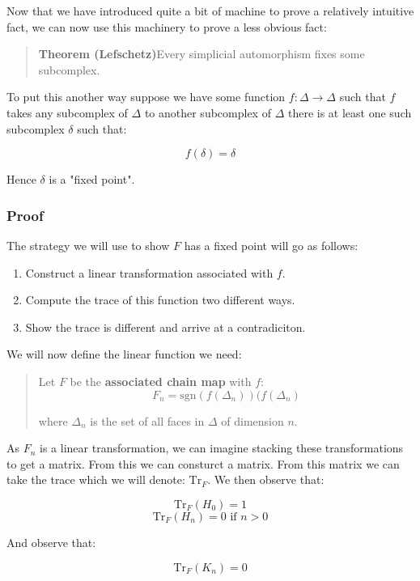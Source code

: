 \documentclass[letterpaper,12pt]{article}
\newcommand{\sgn}{\text{sgn}}
\newcommand{\Tr}{\text{Tr}}
\begin{document}
Now that we have introduced quite a bit of machine to prove a relatively intuitive fact, we can now use this machinery to prove a less obvious fact:

\begin{quote}
    \textbf{Theorem (Lefschetz)}Every simplicial automorphism fixes some subcomplex.
\end{quote}

To put this another way suppose we have some function $f : \Delta \to \Delta$ such that $f$ takes any subcomplex of $\Delta$ to another subcomplex of $\Delta$ there is at least one such subcomplex $\delta$ such that:

$$f(\delta) = \delta$$

Hence $\delta$ is a "fixed point".

\subsubsection{Proof}

The strategy we will use to show $F$ has a fixed point will go as follows:

\begin{enumerate}
    \item{
            Construct a linear transformation associated with $f$.
        }
    \item{
            Compute the trace of this function two different ways.
        }
    \item{
            Show the trace is different and arrive at a contradiciton.
        }
\end{enumerate}

We will now define the linear function we need:

\begin{quote}
    Let $F$ be the \textbf{associated chain map} with $f$:
    $$F_n = \sgn(f(\Delta_n))(f(\Delta_n)$$

    where $\Delta_n$ is the set of all faces in $\Delta$ of dimension $n$.
\end{quote}

As $F_n$ is a linear transformation, we can imagine stacking these transformations to get a matrix. From this we can consturct a matrix. From this matrix we can take the trace which we will denote: $\Tr_F$. We then observe that:

$$\Tr_F(H_0) = 1$$
$$\Tr_F(H_n) = 0 \text{ if } n > 0$$

And observe that:

$$\Tr_F(K_n) = 0$$
\end{document}
